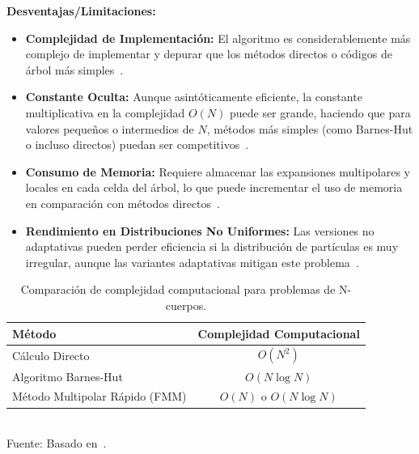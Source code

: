 \textbf{Desventajas/Limitaciones:}
\begin{itemize}
    \item \textbf{Complejidad de Implementación:} El algoritmo es considerablemente más complejo de implementar y depurar que los métodos directos o códigos de árbol más simples~\cite{BeatsonGreengard1997, Martinsson2012}.
    \item \textbf{Constante Oculta:} Aunque asintóticamente eficiente, la constante multiplicativa en la complejidad $O(N)$ puede ser grande, haciendo que para valores pequeños o intermedios de $N$, métodos más simples (como Barnes-Hut o incluso directos) puedan ser competitivos~\cite{Dehnen2002}.
    \item \textbf{Consumo de Memoria:} Requiere almacenar las expansiones multipolares y locales en cada celda del árbol, lo que puede incrementar el uso de memoria en comparación con métodos directos~\cite{YingEtAl2004}.
    \item \textbf{Rendimiento en Distribuciones No Uniformes:} Las versiones no adaptativas pueden perder eficiencia si la distribución de partículas es muy irregular, aunque las variantes adaptativas mitigan este problema~\cite{CarrierEtAl1988, ChengEtAl1999}.
\end{itemize}

\begin{table}[H]
    \centering
    \caption{Comparación de complejidad computacional para problemas de N-cuerpos.}%
    \label{tab:fmm_complexity}
    \begin{tabular}{lc}
        \hline %
        \textbf{Método} & \textbf{Complejidad Computacional} \\
        \hline %
        Cálculo Directo & $O(N^2)$ \\
        Algoritmo Barnes-Hut & $O(N \log N)$ \\
        Método Multipolar Rápido (FMM) & $O(N)$ o $O(N \log N)$ \\
        \hline %
    \end{tabular}\\
    \medskip \small Fuente: Basado en~\cite{GreengardRokhlin1987, BeatsonGreengard1997, Martinsson2012}.
\end{table}
